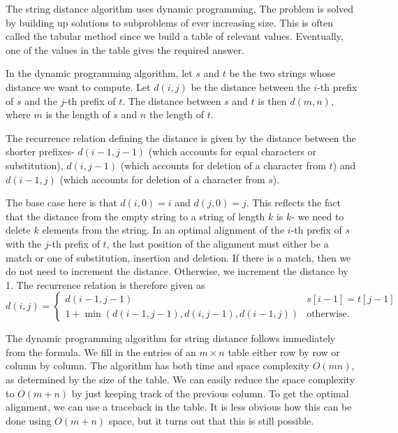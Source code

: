 \documentclass[a4paper, openany]{memoir}
\begin{document}
The string distance algorithm uses dynamic programming. The problem is solved by building up solutions to subproblems of ever increasing size. This is often called the tabular method since we build a table of relevant values. Eventually, one of the values in the table gives the required answer.

In the dynamic programming algorithm, let $s$ and $t$ be the two strings whose distance we want to compute. Let $d(i, j)$ be the distance between the $i$-th prefix of $s$ and the $j$-th prefix of $t$. The distance between $s$ and $t$ is then $d(m, n)$, where $m$ is the length of $s$ and $n$ the length of $t$.

The recurrence relation defining the distance is given by the distance between the shorter prefixes- $d(i-1, j-1)$ (which accounts for equal characters or substitution), $d(i, j-1)$ (which accounts for deletion of a character from $t$) and $d(i-1, j)$ (which accounts for deletion of a character from $s$).

The base case here is that $d(i, 0) = i$ and $d(j, 0) = j$. This reflects the fact that the distance from the empty string to a string of length $k$ is $k$- we need to delete $k$ elements from the string. In an optimal alignment of the $i$-th prefix of $s$ with the $j$-th prefix of $t$, the last position of the alignment must either be a match or one of substitution, insertion and deletion. If there is a match, then we do not need to increment the distance. Otherwise, we increment the distance by 1. The recurrence relation is therefore given as
\[d(i, j) = \begin{cases}
d(i-1, j-1) & s[i-1] = t[j-1] \\
1 + \min(d(i-1, j-1), d(i, j-1), d(i-1, j)) & \text{otherwise}.
\end{cases}\]

The dynamic programming algorithm for string distance follows immediately from the formula. We fill in the entries of an $m \times n$ table either row by row or column by column. The algorithm has both time and space complexity $O(mn)$, as determined by the size of the table. We can easily reduce the space complexity to $O(m+n)$ by just keeping track of the previous column. To get the optimal alignment, we can use a traceback in the table. It is less obvious how this can be done using $O(m+n)$ space, but it turns out that this is still possible.
\end{document}
